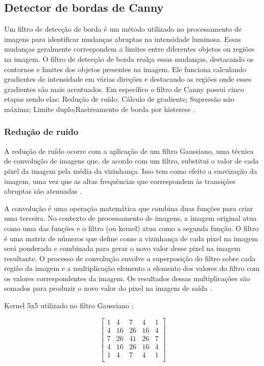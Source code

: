 \subsection[Detector de bordas de Canny]{Detector de bordas de Canny}\label{sec:Detector de bordas de Canny}

Um filtro de detecção de borda é um método utilizado no processamento de imagens para identificar mudanças abruptas na intensidade luminosa. Essas mudanças geralmente correspondem a limites entre diferentes objetos ou regiões na imagem. O filtro de detecção de borda realça essas mudanças, destacando os contornos e limites dos objetos presentes na imagem. Ele funciona calculando gradientes de intensidade em várias direções e destacando as regiões onde esses gradientes são mais acentuados. Em específico o filtro de Canny possui cinco etapas sendo elas: Redução de ruído; Cálculo de gradiente; Supressão não máxima; Limite duplo;Rastreamento de borda por histerese \cite{canny-edge-detection-python}.


\subsubsection[Redução de ruído]{Redução de ruído}
A redução de ruído ocorre com a aplicação de um filtro Gaussiano, uma técnica de convolução de imagens que, de acordo com um filtro, substitui o valor de cada pixel da imagem pela média da vizinhança. Isso tem como efeito a suavização da imagem, uma vez que as altas frequências que correspondem às transições abruptas são atenuadas \cite{filtroGaus}.

A convolução é uma operação matemática que combina duas funções para criar uma terceira. No contexto de processamento de imagens, a imagem original atua como uma das funções e o filtro (ou kernel) atua como a segunda função. O filtro é uma matriz de números que define como a vizinhança de cada pixel na imagem será ponderada e combinada para gerar o novo valor desse pixel na imagem resultante. O processo de convolução envolve a superposição do filtro sobre cada região da imagem e a multiplicação elemento a elemento dos valores do filtro com os valores correspondentes da imagem. Os resultados dessas multiplicações são somados para produzir o novo valor do pixel na imagem de saída \cite{convolucao}.

Kernel 5x5 utilizado no filtro Gaussiano \cite{kernel_gaus}:

\[
    \begin{bmatrix}
        1 & 4 & 7 & 4 & 1 \\
        4 & 16 & 26 & 16 & 4 \\
        7 & 26 & 41 & 26 & 7 \\
        4 & 16 & 26 & 16 & 4 \\
        1 & 4 & 7 & 4 & 1 \\
    \end{bmatrix}
\]

